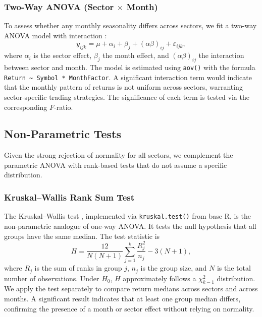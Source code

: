 \documentclass[12pt,a4paper,fleqn]{article}
\begin{document}
\subsubsection{Two-Way ANOVA (Sector \(\times\) Month)}

To assess whether any monthly seasonality differs across sectors, we fit a two-way ANOVA model with interaction \cite{kutner2005applied}:
\[
y_{ijk} = \mu + \alpha_i + \beta_j + (\alpha\beta)_{ij} + \varepsilon_{ijk},
\]
where \(\alpha_i\) is the sector effect, \(\beta_j\) the month effect, and \((\alpha\beta)_{ij}\) the interaction between sector and month. The model is estimated using \texttt{aov()} with the formula \texttt{Return \textasciitilde{} Symbol * MonthFactor}. A significant interaction term would indicate that the monthly pattern of returns is not uniform across sectors, warranting sector-specific trading strategies. The significance of each term is tested via the corresponding \(F\)-ratio.

\subsection{Non-Parametric Tests}

Given the strong rejection of normality for all sectors, we complement the parametric ANOVA with rank-based tests that do not assume a specific distribution.

\subsubsection{Kruskal–Wallis Rank Sum Test}

The Kruskal–Wallis test \cite{kruskal1952use}, implemented via \texttt{kruskal.test()} from base R, is the non-parametric analogue of one-way ANOVA. It tests the null hypothesis that all groups have the same median. The test statistic is
\begin{equation}
H = \frac{12}{N(N+1)} \sum_{j=1}^{k} \frac{R_j^2}{n_j} - 3(N+1),
\label{eq:kruskal}
\end{equation}
where \(R_j\) is the sum of ranks in group \(j\), \(n_j\) is the group size, and \(N\) is the total number of observations. Under \(H_0\), \(H\) approximately follows a \(\chi^2_{k-1}\) distribution. We apply the test separately to compare return medians across sectors and across months. A significant result indicates that at least one group median differs, confirming the presence of a month or sector effect without relying on normality.
\end{document}
